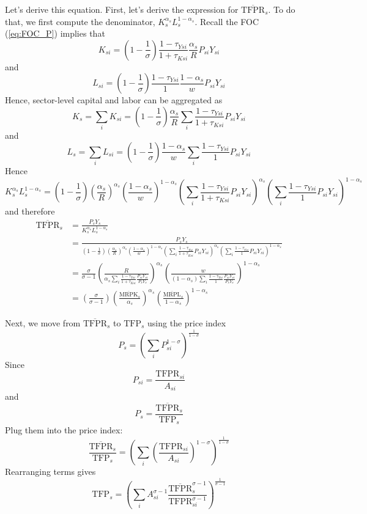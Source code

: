 \documentclass[12pt]{article}
\begin{document}
	Let's derive this equation. First, let's derive the expression for $\overline{\text{TFPR}}_s$. To do that, we first compute the denominator, $K_s^{\alpha_s} L_s^{1-\alpha_s}$. Recall the FOC (\ref{eq:FOC_P}) implies that 
	\[K_{si} = \left(1-\frac{1}{\sigma}\right) \frac{1-\tau_{Ysi}}{1+\tau_{Ksi}} \frac{\alpha_s}{R} P_{si} Y_{si}\]
	and 
	\[L_{si} = \left(1-\frac{1}{\sigma}\right) \frac{1-\tau_{Ysi}}{1} \frac{1-\alpha_s}{w} P_{si} Y_{si}\]
	 Hence, sector-level capital and labor can be aggregated as
	\[K_s = \sum_i K_{si} = \left(1-\frac{1}{\sigma}\right)\frac{\alpha_s}{R} \sum_i \frac{1-\tau_{Ysi}}{1+\tau_{Ksi}} P_{si} Y_{si} \]
	and
	\[L_s = \sum_i L_{si} = \left(1-\frac{1}{\sigma}\right)\frac{1-\alpha_s}{w} \sum_i \frac{1-\tau_{Ysi}}{1} P_{si} Y_{si} \]
	Hence 
	\[K_s^{\alpha_s} L_s^{1-\alpha_s} = \left(1-\frac{1}{\sigma}\right) \left(\frac{\alpha_s}{R}\right)^{\alpha_s} \left(\frac{1-\alpha_s}{w}\right)^{1-\alpha_s} \left(\sum_i \frac{1-\tau_{Ysi}}{1+\tau_{Ksi}} P_{si} Y_{si}\right)^{\alpha_s} \left(\sum_i \frac{1-\tau_{Ysi}}{1} P_{si} Y_{si} \right)^{1-\alpha_s}\]
	and therefore
	\begin{align}
		\overline{\text{TFPR}}_s & = \frac{P_s Y_s}{K_s^{\alpha_s} L_s^{1-\alpha_s}} \nonumber \\
		& = \frac{P_s Y_s}{\left(1-\frac{1}{\sigma}\right) \left(\frac{\alpha_s}{R}\right)^{\alpha_s} \left(\frac{1-\alpha_s}{w}\right)^{1-\alpha_s} \left(\sum_i \frac{1-\tau_{Ysi}}{1+\tau_{Ksi}} P_{si} Y_{si}\right)^{\alpha_s} \left(\sum_i \frac{1-\tau_{Ysi}}{1} P_{si} Y_{si} \right)^{1-\alpha_s}} \nonumber \\
		& = \frac{\sigma}{\sigma -1} \left(\frac{R}{\alpha_s \sum_i \frac{1-\tau_{Ysi}}{1+\tau_{Ksi}} \frac{P_{si} Y_{si}}{P_s Y_s} }\right)^{\alpha_s} \left(\frac{w}{(1-\alpha_s) \sum_i \frac{1-\tau_{Ysi}}{1} \frac{P_{si} Y_{si}}{P_s Y_s} }\right)^{1-\alpha_s} \nonumber \\
		& = \left(\frac{\sigma}{\sigma -1}\right) \left(\frac{\overline{\text{MRPK}}_s}{\alpha_s}\right)^{\alpha_s}\left(\frac{\overline{\text{MRPL}}_s}{1-\alpha_s}\right)^{1-\alpha_s}
	\end{align}
	
		Next, we move from $\overline{\text{TFPR}}_s$ to $\text{TFP}_s$ using the price index
	\begin{equation}
		P_s = \left(\sum_i P_{si}^{1-\sigma}\right)^{\frac{1}{1-\sigma}}
	\end{equation}
	Since 
	\[P_{si} = \frac{\text{TFPR}_{si}}{A_{si}}\]
	and
	\[P_s = \frac{\overline{\text{TFPR}}_s}{\text{TFP}_s}\]
	Plug them into the price index:
	\begin{equation*}
		\frac{\overline{\text{TFPR}}_s}{\text{TFP}_s} = \left(\sum_i \left(\frac{\text{TFPR}_{si}}{A_{si}}\right)^{1-\sigma}\right)^{\frac{1}{1-\sigma}}
	\end{equation*}
	Rearranging terms gives
\begin{equation} \label{eq:tfp_s}
	\text{TFP}_s = \left(\sum_i A_{si}^{\sigma -1} \frac{\overline{\text{TFPR}}_s^{\sigma -1}}{\text{TFPR}_{si}^{\sigma-1}}\right)^{\frac{1}{\sigma-1}}
\end{equation}
	
\end{document}
